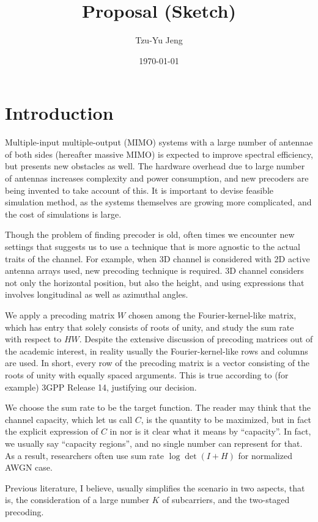 \documentclass[12pt]{article}
\author{Tzu-Yu Jeng}
\date{\today}
\title{Proposal (Sketch)}
\begin{document}
\maketitle

\section{Introduction}

Multiple-input multiple-output (MIMO) systems with a large number of antennae of both sides (hereafter massive MIMO) is expected to improve spectral efficiency, but presents new obstacles as well.
The hardware overhead due to large number of antennas increases complexity and power consumption, and new precoders are being invented to take account of this.
It is important to devise feasible simulation method, as the systems themselves are growing more complicated, and the cost of simulations is large.

Though the problem of finding precoder is old, often times we encounter new settings that suggests us to use a technique that is more agnostic to the actual traits of the channel.
For example, when 3D channel is considered with 2D active antenna arrays used, new precoding technique is required.
3D channel considers not only the horizontal position, but also the height, and using expressions that involves longitudinal as well as azimuthal angles.

We apply a precoding matrix \(W\) chosen among the Fourier-kernel-like matrix, which has entry that solely consists of roots of unity, and study the sum rate with respect to \(HW\).
Despite the extensive discussion of precoding matrices out of the academic interest, in reality usually the Fourier-kernel-like rows and columns are used.
In short, every row of the precoding matrix is a vector consisting of the roots of unity with equally spaced arguments.
This is true according to (for example) 3GPP Release 14, justifying our decision.

We choose the sum rate to be the target function.
The reader may think that the channel capacity, which let us call \(C\), is the quantity to be maximized, but in fact the explicit expression of \(C\) in 
nor is it clear what it means by ``capacity''.
In fact, we usually say ``capacity regions'', and no single number can represent for that.
As a result, researchers often use sum rate \(\log\det(I+H)\) for normalized AWGN case.

Previous literature, I believe, usually simplifies the scenario in two aspects, that is, the consideration of a large number \(K\) of subcarriers, and the two-staged precoding.
\end{document}

